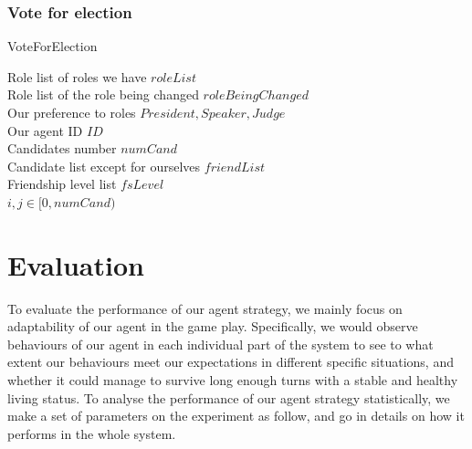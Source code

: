 \subsubsection{Vote for election}
\begin{algorithm}
\caption{VoteForElection} 
    Role list of roles we have $roleList$\\
    Role list of the role being changed  $roleBeingChanged$\\
    Our preference to roles ${President, Speaker, Judge}$\\
    Our agent ID $ID$\\
    Candidates number $numCand$\\
    Candidate list except for ourselves $friendList$\\
    Friendship level list $fsLevel$\\
    $i, j \in [0, numCand)$\\
\end{algorithm}

\section{Evaluation} \label{sec:Team6_Evaluation}
To evaluate the performance of our agent strategy, we mainly focus on adaptability of our agent in the game play. Specifically, we would observe behaviours of our agent in each individual part of the system to see to what extent our behaviours meet our expectations in different specific situations, and whether it could manage to survive long enough turns with a stable and healthy living status. To analyse the performance of our agent strategy statistically, we make a set of parameters on the experiment as follow, and go in details on how it performs in the whole system.

